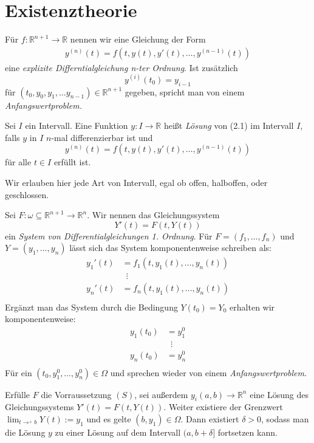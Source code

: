 \documentclass{report}
\newcommand{\bR}{\mathbb{R}}
\begin{document}
\section{Existenztheorie}
\begin{definition}
	Für $f : \bR^{n+1} \to \bR$ nennen wir eine Gleichung der Form
	\begin{align*}
		y^{(n)}(t) = f(t, y(t), y'(t), \hdots, y^{(n-1)}(t))
	\end{align*}
eine \textit{explizite Differntialgleichung n-ter Ordnung}. Ist zusätzlich
\[y^{(i)}(t_0) = y_{i-1}\]
für $(t_0, y_0, y_1, \hdots y_{n-1}) \in \bR^{n+1}$ gegeben, spricht man von einem \textit{Anfangswertproblem.}
\end{definition}
\begin{definition}
	Sei $I$ ein Intervall. Eine Funktion $y : I \to \bR$ heißt \textit{Lösung} von (2.1) im Intervall $I$, falls $y$ in $I$ $n$-mal differenzierbar ist und
	\[y^{(n)}(t) = f(t, y(t), y'(t), \hdots, y^{(n-1)}(t))\]
	für alle $t \in I$ erfüllt ist.
\end{definition}
Wir erlauben hier jede Art von Intervall, egal ob offen, halboffen, oder geschlossen.
\begin{definition}
	Sei $F : \omega \subseteq \bR^{n+1} \to \bR^n$. Wir nennen das Gleichungssystem
	\[Y'(t) = F(t, Y(t))\]
	ein \textit{System von Differentialgleichungen 1. Ordnung}. Für $F = (f_1, \hdots, f_n)$ und $Y = (y_1, \hdots, y_n)$ lässt sich das System komponentenweise schreiben als:
	\begin{align*}
		y_1'(t) &= f_1(t, y_1(t), \hdots, y_n(t))\\
		&\hspace{6pt}\vdots\\
		y_n'(t) &= f_n(t, y_1(t), \hdots, y_n(t))\\
	\end{align*}
	Ergänzt man das System durch die Bedingung $Y(t_0) = Y_0$ erhalten wir komponentenweise:
	\begin{align*}
		y_1(t_0) &= y_1^0\\
		&\hspace{6pt}\vdots\\
		y_n(t_0) &= y_n^0\\
	\end{align*}
	Für ein $(t_0, y_1^0, \hdots, y_n^0) \in \Omega$ und sprechen wieder von einem \textit{Anfangswertproblem}.
\end{definition}
\begin{lemma}
 Erfülle $F$ die Vorraussetzung $(S)$, sei außerdem $y_i (a,b) \to \bR^n$ eine Lösung des Gleichungssystems $Y'(t) = F(t,Y(t))$. Weiter existiere der Grenzwert $\lim_{t \to^+ b} Y(t) := y_1$ und es gelte $(b,y_1) \in \Omega$. Dann existiert $\delta > 0$, sodass man die Lösung $y$ zu einer Lösung auf dem Intervall $(a, b+\delta]$ fortsetzen kann.
\end{lemma}
\end{document}
